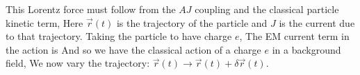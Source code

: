 \documentclass[prd,longbibliography,nofootinbib]{revtex4-2}
\begin{document}
This Lorentz force must follow from the $A J$ coupling and the classical particle kinetic term,
Here $\vec{r}(t)$ is the trajectory of the particle and $J$ is the current due to that trajectory. 
Taking the particle to have charge $e$,
The EM current term in the action is  
And so we have the classical action of a charge $e$ in a background field,
We now vary the trajectory: $\vec{r}(t) \rightarrow \vec{r}(t) + \delta \vec{r}(t)$. 


\end{document}
